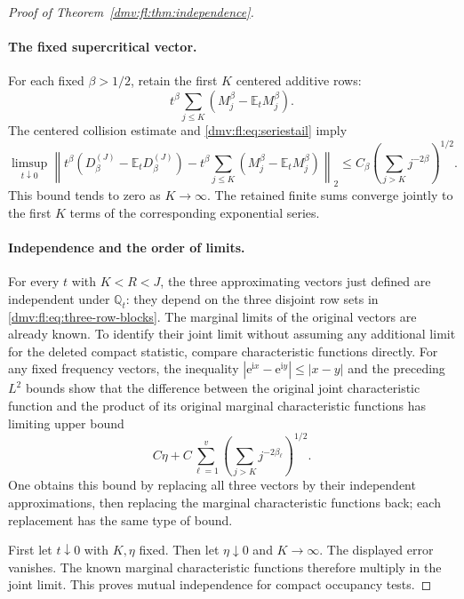 \documentclass[11pt,letterpaper]{article}
\numberwithin{equation}{section}
\theoremstyle{definition}\newtheorem{definition}[theorem]{Definition}
\theoremstyle{remark}\newtheorem{remark}[theorem]{Remark}
\newcommand{\E}{\mathbb E}
\newcommand{\ii}{\mathrm i}
\newcommand{\ee}{\mathrm e}
\newcommand{\Q}{\mathbb Q}
\begin{document}
\begin{proof}[Proof of Theorem~\ref{dmv:fl:thm:independence}]
\paragraph{The fixed supercritical vector.}
For each fixed $\beta>1/2$, retain the first $K$ centered
additive rows:
\[
       t^\beta\sum_{j\le K}
                 (M_j^\beta-\E_tM_j^\beta).
\]
The centered collision estimate and \eqref{dmv:fl:eq:seriestail} imply
\begin{equation}
 \limsup_{t\downarrow0}
 \left\|
 t^\beta(D_\beta^{(J)}-\E_tD_\beta^{(J)})
 -
 t^\beta\sum_{j\le K}(M_j^\beta-\E_tM_j^\beta)
 \right\|_2
 \le
 C_\beta\left(\sum_{j>K}j^{-2\beta}\right)^{1/2}.
 \label{dmv:fl:eq:high-first-block}
\end{equation}
This bound tends to zero as $K\to\infty$. The retained finite
sums converge jointly to the first $K$ terms of the corresponding
exponential series.

\paragraph{Independence and the order of limits.}
For every $t$ with $K<R<J$, the three approximating vectors just
defined are independent under $\Q_t$: they depend on the three
disjoint row sets in \eqref{dmv:fl:eq:three-row-blocks}.
The marginal limits of the original vectors are already known.
To identify their joint limit without assuming any additional
limit for the deleted compact statistic, compare characteristic
functions directly. For any fixed frequency vectors, the inequality
$|\ee^{\ii x}-\ee^{\ii y}|\le|x-y|$ and the preceding $L^2$ bounds
show that the difference between the original joint characteristic
function and the product of its original marginal characteristic
functions has limiting upper bound
\[
 C\eta+
 C\sum_{\ell=1}^v
      \left(\sum_{j>K}j^{-2\beta_\ell}\right)^{1/2}.
\]
One obtains this bound by replacing all three vectors by their
independent approximations, then replacing the marginal
characteristic functions back; each replacement has the same
type of bound.

First let $t\downarrow0$ with $K,\eta$ fixed. Then let
$\eta\downarrow0$ and $K\to\infty$. The displayed error vanishes.
The known marginal characteristic functions therefore multiply
in the joint limit. This proves mutual independence for compact
occupancy tests.


\end{proof}
\end{document}
